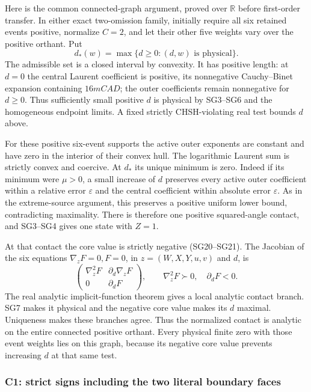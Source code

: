 Here is the common connected-graph argument, proved over \(\mathbb R\)
before first-order transfer.  In either exact two-omission family,
initially require all six retained events positive, normalize \(C=2\),
and let their other five weights vary over the positive orthant.  Put
\[
 d_*(w)=\max\{d\ge0:(d,w)\text{ is physical}\}.
 \tag{EN3}
\]
The admissible set is a closed interval by convexity.  It has positive
length: at \(d=0\) the central Laurent coefficient is positive, its
nonnegative Cauchy--Binet expansion containing \(16mCAD\); the outer
coefficients remain nonnegative for \(d\ge0\).  Thus sufficiently small
positive \(d\) is physical by SG3--SG6 and the homogeneous endpoint
limits.  A fixed strictly CHSH-violating real test bounds \(d\) above.

For these positive six-event supports the active outer exponents are
constant and have zero in the interior of their convex hull.  The
logarithmic Laurent sum is strictly convex and coercive.  At \(d_*\)
its unique minimum is zero.  Indeed if its minimum were \(\mu>0\),
a small increase of \(d\) preserves every active outer coefficient
within a relative error \(\varepsilon\) and the central coefficient
within absolute error \(\varepsilon\).  As in the extreme-source argument, this preserves a
positive uniform lower bound, contradicting maximality.
There is therefore one positive squared-angle contact, and SG3--SG4 gives
one state with \(Z=1\).

At that contact the core value is strictly negative (SG20--SG21).
The Jacobian of the six equations
\(\nabla_zF=0,F=0\), in \(z=(W,X,Y,u,v)\) and \(d\), is
\[
 \begin{pmatrix}\nabla_z^2F&\partial_d\nabla_zF\\
 0&\partial_dF\end{pmatrix},
 \qquad \nabla_z^2F\succ0,\quad\partial_dF<0 .
 \tag{EN4}
\]
The real analytic implicit-function theorem gives a local analytic
contact branch.  SG7 makes it physical and the negative core value
makes its \(d\) maximal.  Uniqueness makes these branches agree.
Thus the normalized contact is analytic on the entire connected
positive orthant.  Every physical finite zero with those event weights
lies on this graph, because its negative core value prevents increasing
\(d\) at that same test.

\subsubsection*{C1: strict signs including the two literal boundary faces}

